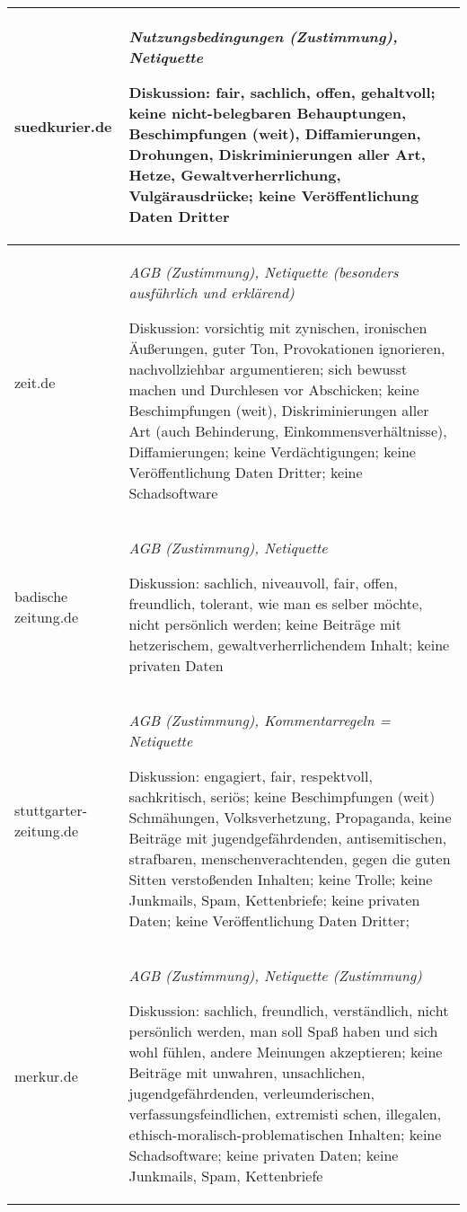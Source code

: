 \begin{landscape}
\begin{longtable}{lp{170mm}}
suedkurier.de & \emph{Nutzungsbedingungen (Zustimmung), Netiquette}

	Diskussion: fair, sachlich, offen, gehaltvoll; 
	keine nicht-belegbaren Be\-haup\-tun\-gen, Beschimpfungen (weit), Dif\-fam\-ier\-un\-gen, Dro\-hun\-gen, Dis\-kri\-mi\-nie\-run\-gen
	aller Art, Hetze, Ge\-walt\-ver\-herr\-li\-chung, Vul\-gär\-aus\-drücke; keine Veröffentlichung Daten
	Dritter\tabularnewline\midrule


zeit.de & \emph{AGB (Zustimmung), Netiquette (besonders ausführlich und erklärend)}

	Diskussion: vorsichtig mit zynischen, ironischen Äußerungen, guter Ton, Provokationen ignorieren, nachvollziehbar argumentieren;
	sich bewusst machen und Durchlesen vor Abschicken;
	keine Beschimpfungen (weit), Diskriminierungen aller Art (auch Behinderung, Einkommensverhältnisse), Diffamierungen; 
	keine Verdächtigungen; 
	keine Veröffentlichung Daten Dritter; 
	keine Schadsoftware\tabularnewline\midrule

badische zeitung.de & \emph{AGB (Zustimmung), Netiquette}

	Diskussion: sachlich, niveauvoll, fair, offen, freundlich, tolerant, wie man es selber möchte, nicht persönlich werden; 
	keine Beiträge mit hetzerischem, gewaltverherrlichendem Inhalt; 
	keine privaten Daten\tabularnewline\midrule

stuttgarter-zeitung.de & \emph{AGB (Zustimmung), Kommentarregeln = Netiquette}

	Diskussion: engagiert, fair, respektvoll, sachkritisch, seriös; 
	keine Beschimpfungen (weit) Schmä\-hun\-gen, Volks\-ver\-het\-zung, Pro\-pa\-gan\-da,
	keine Beiträge mit
	ju\-gend\-ge\-fähr\-den\-den, an\-ti\-se\-mi\-ti\-schen, straf\-ba\-ren, men\-schen\-ver\-ach\-ten\-den, ge\-gen
	die guten Sitten verstoßenden Inhalten; 
	keine Trolle; 
	keine Junkmails, Spam, Kettenbriefe; 
	keine privaten Daten; 
	keine Veröffentlichung Daten Dritter; \tabularnewline\midrule

merkur.de & \emph{AGB (Zustimmung), Netiquette (Zustimmung)}

	Diskussion: sachlich, freundlich, verständlich, nicht persönlich werden, man soll Spaß haben und
	sich wohl fühlen, andere Meinungen akzeptieren; 
	keine Beiträge mit un\-wah\-ren, un\-sach\-lichen, ju\-gend\-ge\-fähr\-den\-den, ver\-leum\-de\-ri\-schen, ver\-fas\-sungs\-feind\-li\-chen, ex\-tre\-mis\-ti\-			schen, il\-le\-ga\-len, ethisch-mo\-ra\-lisch-pro\-ble\-ma\-ti\-schen Inhalten; 
	keine Schadsoftware; 
	keine privaten Daten; 
	keine Junkmails, Spam, Kettenbriefe\tabularnewline\midrule


\end{longtable}
\end{landscape}
